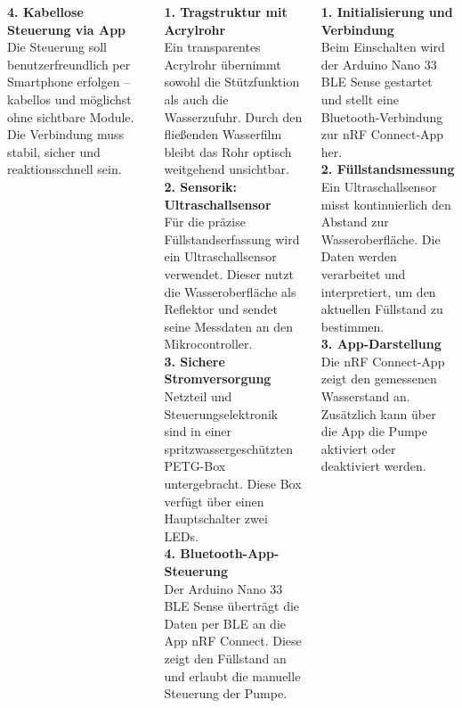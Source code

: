 \documentclass[25pt,a0paper, portrait]{tikzposter}
\begin{document}
\begin{columns}
{{				\textbf{4. Kabellose Steuerung via App} \\
				Die Steuerung soll benutzerfreundlich per Smartphone erfolgen – kabellos und möglichst ohne sichtbare Module. Die Verbindung muss stabil, sicher und reaktionsschnell sein.
			}
			
			
			
			{
				\textbf{1. Tragstruktur mit Acrylrohr} \\
				Ein transparentes Acrylrohr übernimmt sowohl die Stützfunktion als auch die Wasserzufuhr. Durch den fließenden Wasserfilm bleibt das Rohr optisch weitgehend unsichtbar. \\[1em]
				
				\textbf{2. Sensorik: Ultraschallsensor} \\
				Für die präzise Füllstandserfassung wird ein Ultraschallsensor verwendet. Dieser nutzt die Wasseroberfläche als Reflektor und sendet seine Messdaten an den Mikrocontroller. \\[1em]
				
				\textbf{3. Sichere Stromversorgung} \\
				Netzteil und Steuerungselektronik sind in einer spritzwassergeschützten PETG-Box untergebracht. Diese Box verfügt über einen Hauptschalter zwei LEDs. \\[1em]
				
				\textbf{4. Bluetooth-App-Steuerung} \\
				Der Arduino Nano 33 BLE Sense überträgt die Daten per BLE an die App nRF Connect. Diese zeigt den Füllstand an und erlaubt die manuelle Steuerung der Pumpe.
				
			}

			{
				\textbf{1. Initialisierung und Verbindung} \\
				Beim Einschalten wird der Arduino Nano 33 BLE Sense gestartet und stellt eine Bluetooth-Verbindung zur nRF Connect-App her. \\[1em]
				
				\textbf{2. Füllstandsmessung} \\
				Ein Ultraschallsensor misst kontinuierlich den Abstand zur Wasseroberfläche. Die Daten werden verarbeitet und interpretiert, um den aktuellen Füllstand zu bestimmen. \\[1em]
				
				\textbf{3. App-Darstellung} \\
				Die nRF Connect-App zeigt den gemessenen Wasserstand an. Zusätzlich kann über die App die Pumpe aktiviert oder deaktiviert werden. \\[1em]
				
}}
\end{columns}
\end{document}

